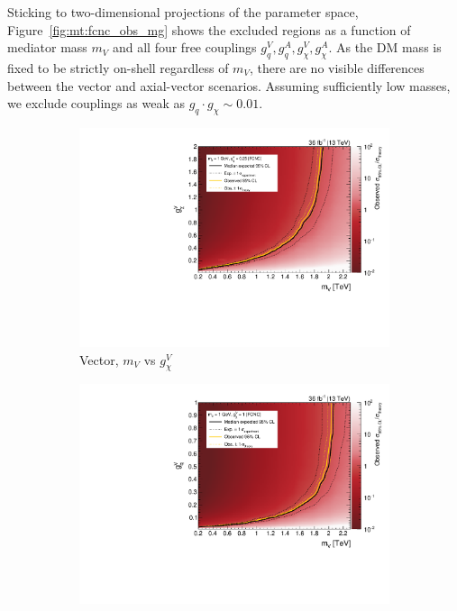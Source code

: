 Sticking to two-dimensional projections of the parameter space, Figure~\ref{fig:mt:fcnc_obs_mg} shows the excluded regions as a function of mediator mass $m_V$ and all four free couplings $g_q^V,g_q^A,g_\chi^V,g_\chi^A$. 
As the DM mass is fixed to be strictly on-shell regardless of $m_V$, there are no visible differences between the vector and axial-vector scenarios. 
Assuming sufficiently low masses, we exclude couplings as weak as $g_q \cdot g_\chi \sim 0.01$.  

\begin{figure}[]
    \begin{center}
        \begin{subfigure}[t]{0.49\textwidth}
            \includegraphics[width=\textwidth]{figures/monotop/results/fcnc2d_obs_gdmv_mV.pdf}
            \caption{Vector, $m_V$ vs $g_\chi^V$}
        \end{subfigure}
        \begin{subfigure}[t]{0.49\textwidth}
            \includegraphics[width=\textwidth]{figures/monotop/results/fcnc2d_obs_gqv_mV.pdf}

\end{subfigure}
\end{center}
\end{figure}
